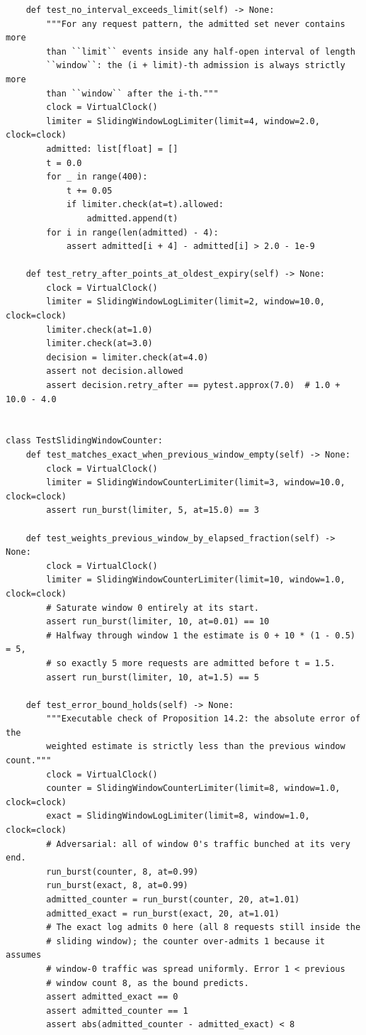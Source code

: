 \begin{verbatim}
    def test_no_interval_exceeds_limit(self) -> None:
        """For any request pattern, the admitted set never contains more
        than ``limit`` events inside any half-open interval of length
        ``window``: the (i + limit)-th admission is always strictly more
        than ``window`` after the i-th."""
        clock = VirtualClock()
        limiter = SlidingWindowLogLimiter(limit=4, window=2.0, clock=clock)
        admitted: list[float] = []
        t = 0.0
        for _ in range(400):
            t += 0.05
            if limiter.check(at=t).allowed:
                admitted.append(t)
        for i in range(len(admitted) - 4):
            assert admitted[i + 4] - admitted[i] > 2.0 - 1e-9

    def test_retry_after_points_at_oldest_expiry(self) -> None:
        clock = VirtualClock()
        limiter = SlidingWindowLogLimiter(limit=2, window=10.0, clock=clock)
        limiter.check(at=1.0)
        limiter.check(at=3.0)
        decision = limiter.check(at=4.0)
        assert not decision.allowed
        assert decision.retry_after == pytest.approx(7.0)  # 1.0 + 10.0 - 4.0


class TestSlidingWindowCounter:
    def test_matches_exact_when_previous_window_empty(self) -> None:
        clock = VirtualClock()
        limiter = SlidingWindowCounterLimiter(limit=3, window=10.0, clock=clock)
        assert run_burst(limiter, 5, at=15.0) == 3

    def test_weights_previous_window_by_elapsed_fraction(self) -> None:
        clock = VirtualClock()
        limiter = SlidingWindowCounterLimiter(limit=10, window=1.0, clock=clock)
        # Saturate window 0 entirely at its start.
        assert run_burst(limiter, 10, at=0.01) == 10
        # Halfway through window 1 the estimate is 0 + 10 * (1 - 0.5) = 5,
        # so exactly 5 more requests are admitted before t = 1.5.
        assert run_burst(limiter, 10, at=1.5) == 5

    def test_error_bound_holds(self) -> None:
        """Executable check of Proposition 14.2: the absolute error of the
        weighted estimate is strictly less than the previous window count."""
        clock = VirtualClock()
        counter = SlidingWindowCounterLimiter(limit=8, window=1.0, clock=clock)
        exact = SlidingWindowLogLimiter(limit=8, window=1.0, clock=clock)
        # Adversarial: all of window 0's traffic bunched at its very end.
        run_burst(counter, 8, at=0.99)
        run_burst(exact, 8, at=0.99)
        admitted_counter = run_burst(counter, 20, at=1.01)
        admitted_exact = run_burst(exact, 20, at=1.01)
        # The exact log admits 0 here (all 8 requests still inside the
        # sliding window); the counter over-admits 1 because it assumes
        # window-0 traffic was spread uniformly. Error 1 < previous
        # window count 8, as the bound predicts.
        assert admitted_exact == 0
        assert admitted_counter == 1
        assert abs(admitted_counter - admitted_exact) < 8



\end{verbatim}
